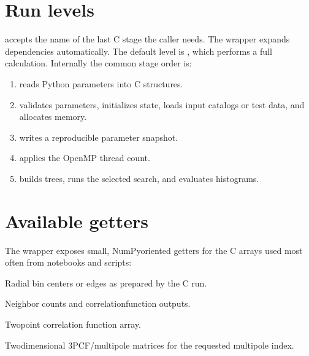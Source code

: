 \documentclass[letterpaper,10pt,english]{sphinxmanual}
\begin{document}
\section{Run levels}
\label{\detokenize{python:run-levels}}
\sphinxAtStartPar
{} accepts the name of the last C stage the caller needs. The
wrapper expands dependencies automatically. The default level is
\sphinxcode{\sphinxupquote{{[}"MainLoop"{]}}}, which performs a full calculation. Internally the common stage
order is:
\begin{enumerate}
%
\item {} 
\sphinxAtStartPar
{} reads Python parameters into C structures.

\item {} 
\sphinxAtStartPar
{} validates parameters, initializes state, loads input
catalogs or test data, and allocates memory.

\item {} 
\sphinxAtStartPar
{} writes a reproducible parameter snapshot.

\item {} 
\sphinxAtStartPar
{} applies the OpenMP thread count.

\item {} 
\sphinxAtStartPar
{} builds trees, runs the selected search, and evaluates
histograms.

\end{enumerate}


\section{Available getters}
\label{\detokenize{python:available-getters}}
\sphinxAtStartPar
The wrapper exposes small, NumPy\sphinxhyphen{}oriented getters for the C arrays used most
often from notebooks and scripts:
\begin{description}
\sphinxAtStartPar
Radial bin centers or edges as prepared by the C run.

\sphinxAtStartPar
Neighbor counts and correlation\sphinxhyphen{}function outputs.

\sphinxAtStartPar
Two\sphinxhyphen{}point correlation function array.

\sphinxAtStartPar
Two\sphinxhyphen{}dimensional 3PCF/multipole matrices for the requested multipole index.

\end{description}
\end{document}
